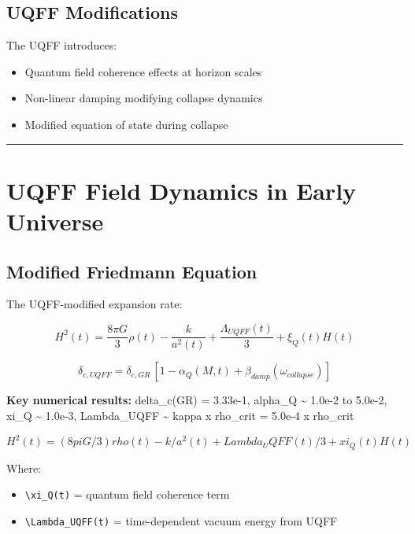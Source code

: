 \documentclass[12pt,a4paper]{article}
\begin{document}
\subsection{UQFF Modifications}

The UQFF introduces:

\begin{itemize}
  \item Quantum field coherence effects at horizon scales
  \item Non-linear damping modifying collapse dynamics
  \item Modified equation of state during collapse
\end{itemize}

\medskip\hrule\medskip

\section{UQFF Field Dynamics in Early Universe}

\subsection{Modified Friedmann Equation}

The UQFF-modified expansion rate:

\begin{equation}
H^2(t) = \frac{8\pi G}{3}\rho(t) - \frac{k}{a^2(t)} + \frac{\Lambda_{UQFF}(t)}{3} + \xi_Q(t)H(t)
\end{equation}

\begin{equation}
\delta_{c,UQFF} = \delta_{c,GR}\,[1 - \alpha_Q(M,t) + \beta_{damp}(\omega_{collapse})]
\end{equation}

\textbf{Key numerical results:} delta\_c(GR) = 3.33e-1, alpha\_Q \textasciitilde{} 1.0e-2 to 5.0e-2, xi\_Q \textasciitilde{} 1.0e-3, Lambda\_UQFF \textasciitilde{} kappa x rho\_crit = 5.0e-4 x rho\_crit

\begin{equation}
H^2(t) = (8piG/3)rho(t) - k/a^2(t) + Lambda_UQFF(t)/3 + xi_Q(t)H(t)
\end{equation}

Where:

\begin{itemize}
  \item \texttt{\textbackslash xi\_Q(t)} = quantum field coherence term
  \item \texttt{\textbackslash Lambda\_UQFF(t)} = time-dependent vacuum energy from UQFF
\end{itemize}
\end{document}
